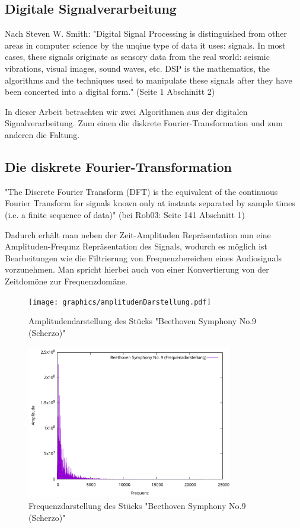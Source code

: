 \documentclass[paper=a4,fontsize=12pt,ngerman]{scrartcl}
\begin{document}
\subsection{Digitale Signalverarbeitung}

Nach Steven W. Smith: "Digital Signal Processing is distinguished from other areas
in computer science by the unqiue type of data it uses: signals. In most cases, these signals originate as sensory data from the real world: seismic vibrations, visual
images, sound waves, etc. DSP is the mathematics, the algorithms and the techniques used to manipulate these signals after they have been concerted into a digital
form."\cite{sws1} (Seite 1 Abschinitt 2)

In dieser Arbeit betrachten wir zwei Algorithmen aus der digitalen Signalverarbeitung. Zum einen die diskrete Fourier-Transformation und zum anderen die Faltung.

\subsection{Die diskrete Fourier-Transformation}

"The Discrete Fourier Transform (DFT) is the equivalent of the continuous Fourier
Transform for signals known only at instants separated by sample times (i.e.
a finite sequence of data)"\cite{roberts_dft_slides, Anand2010FFT} (bei Rob03: Seite 141 Abschnitt 1)

Dadurch erhält man neben der Zeit-Amplituden Repräsentation nun eine Amplituden-Frequnz Repräsentation des Signals, wodurch es möglich ist Bearbeitungen wie die Filtrierung von Frequenzbereichen eines Audiosignals vorzunehmen.
Man spricht hierbei auch von einer Konvertierung von der Zeitdomöne zur Frequenzdomäne.

\begin{figure}[H]
    \centering
    \texttt{[image: graphics/amplitudenDarstellung.pdf]}
    \caption{Amplitudendarstellung des Stücks "Beethoven Symphony No.9 (Scherzo)"}
    \label{fig:scherzo-amplitude}
\end{figure}

\begin{figure}[H]
    \centering
    \includegraphics[width=0.8\textwidth]{graphics/frequnzDarstellung.pdf}
    \caption{Frequenzdarstellung des Stücks "Beethoven Symphony No.9 (Scherzo)"}
    \label{fig:scherzo-frequenz}
\end{figure}
\end{document}
